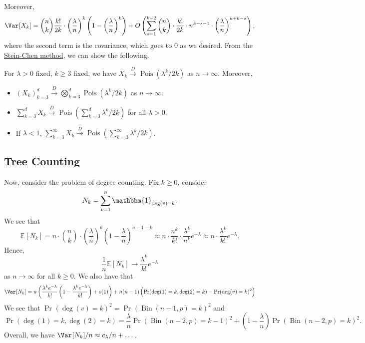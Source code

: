 Moreover,
\[
	\Var_{}[X_k]
	= \binom{n}{k} \frac{k!}{2k} \cdot \left( \frac{\lambda}{n} \right) ^k \left( 1 - \left( \frac{\lambda}{n} \right) ^k \right) + O\left( \sum_{s=1}^{k-2} \binom{n}{k} \cdot \frac{k!}{2k} \cdot n^{k - s - 1} \cdot \left( \frac{\lambda}{n} \right)^{k + k - s} \right),
\]
where the second term is the covariance, which goes to \(0\) as we desired. From the \hyperref[thm:Stein-Chen-method]{Stein-Chen method}, we can show the following.

\begin{theorem}
	For \(\lambda > 0\) fixed, \(k \geq 3\) fixed, we have \(X_k \overset{D}{\to} \operatorname{Pois}(\lambda ^k / 2k) \) as \(n \to \infty \). Moreover,
	\begin{itemize}
		\item \((X_k)_{k = 3}^d \overset{D}{\to} \bigotimes_{k=3}^d \operatorname{Pois}(\lambda ^k / 2k) \) as \(n \to \infty \).
		\item \(\sum_{k=3}^{d} X_k \overset{D}{\to} \operatorname{Pois}(\sum_{k=3}^{d} \lambda ^k / 2k) \) for all \(\lambda > 0\).
		\item If \(\lambda < 1\), \(\sum_{k=3}^{\infty} X_k \overset{D}{\to} \operatorname{Pois}(\sum_{k=3}^{\infty} \lambda ^k / 2k) \).
	\end{itemize}
\end{theorem}

\subsection{Tree Counting}
Now, consider the problem of degree counting. Fix \(k \geq 0\), consider
\[
	N_k = \sum_{v=1}^{n} \mathbbm{1}_{\deg (v) = k}.
\]
We see that
\[
	\mathbb{E}_{}[N_k]
	= n \cdot \binom{n}{k} \cdot \left( \frac{\lambda}{n} \right) ^k \left( 1 - \frac{\lambda}{n} \right) ^{n-1-k}
	\approx n \cdot \frac{n^k}{k!} \cdot \frac{\lambda ^k}{n^k} e^{-\lambda }
	\approx n \cdot \frac{\lambda ^k}{k!} e^{-\lambda }.
\]
Hence,
\[
	\frac{1}{n} \mathbb{E}_{}[N_k]
	\to \frac{\lambda ^k}{k!} e^{-\lambda }
\]
as \(n \to \infty \) for all \(k \geq 0\). We also have that
\[
	\Var_{}[N_k]
	= n \left( \frac{\lambda ^k e^{-\lambda }}{k!} \left( 1 - \frac{\lambda ^k e^{-\lambda }}{k!} \right) + o(1) \right) + n(n-1) \left( \Pr_{}(\deg (1) = k, \deg (2) = k) - \Pr_{}(\deg (v) = k)^2 \right)
\]
We see that \(\Pr_{}(\deg (v) = k)^2 = \Pr_{}(\operatorname{Bin}(n-1, p) =k)^2\) and
\[
	\Pr_{}(\deg (1) = k, \deg (2) = k)
	= \frac{\lambda}{n} \Pr_{}(\operatorname{Bin}(n-2, p) = k-1 ) ^2 + \left( 1 - \frac{\lambda}{n} \right) \Pr_{}(\operatorname{Bin}(n-2, p) = k )^2.
\]
Overall, we have \(\Var_{}[N_k] / n \approx c_\lambda / n + \dots \).

